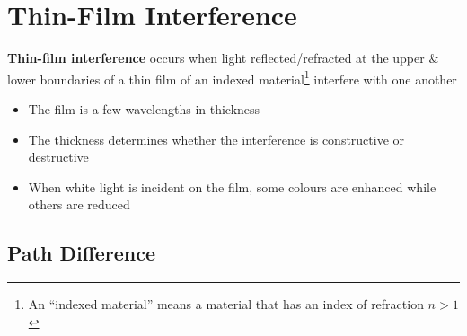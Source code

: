 \chapter{Thin-Film Interference} %



\textbf{Thin-film interference} occurs when light reflected/refracted at
the upper \& lower boundaries of a thin film of an indexed
material\footnote{An ``indexed material'' means a material that has an index
of refraction $n>1$} interfere with one another
\begin{itemize}
\item The film is a few wavelengths in thickness
\item The thickness determines whether the interference is constructive or
  destructive
\item When white light is incident on the film, some colours are enhanced
  while others are reduced
\end{itemize}







\section{Path Difference}

